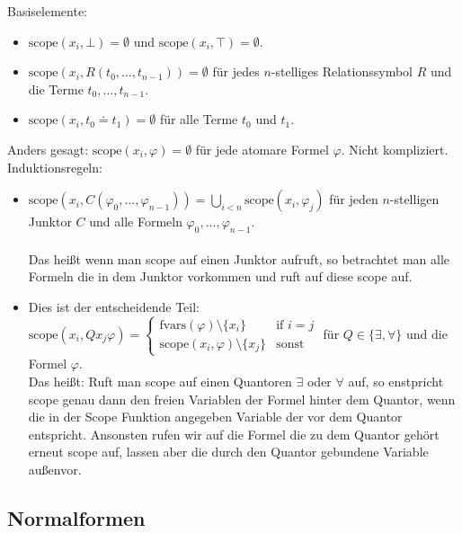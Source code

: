\documentclass[twocolumn]{article}
\begin{document}
    Basiselemente:
    \begin{itemize}
        \item $\text{scope}(x_i, \bot) = \emptyset$ und $\text{scope}(x_i, \top) = \emptyset$.
        \item $\text{scope}(x_i, R(t_0, \dots, t_{n-1})) = \emptyset$ für jedes $n$-stelliges Relationssymbol $R$ und die Terme $t_0, \dots, t_{n-1}$.
        \item $\text{scope}(x_i, t_0 \doteq t_1) = \emptyset$ für alle Terme $t_0$ und $t_1$.
    \end{itemize}
    Anders gesagt: $\text{scope}(x_i, \varphi) = \emptyset$ für jede atomare Formel $\varphi$. Nicht kompliziert.\\

    Induktionsregeln:
    \begin{itemize}
        \item $\text{scope}(x_i, C(\varphi_0, \dots, \varphi_{n-1})) = \bigcup_{i<n} \text{scope}(x_i, \varphi_j)$ für jeden $n$-stelligen Junktor $C$ und alle Formeln $\varphi_0, \dots, \varphi_{n-1}$.\\\\
            Das heißt wenn man scope auf einen Junktor aufruft, so betrachtet man alle Formeln die in dem Junktor vorkommen und ruft auf diese scope auf.
        \item 
            Dies ist der entscheidende Teil:\\
            $\text{scope}(x_i, Q x_j \varphi) = \begin{cases}\text{fvars}(\varphi) \setminus \{x_i\} & \text{if $i = j$}\\ \text{scope}(x_i, \varphi) \setminus \{x_j\} & \text{sonst}\end{cases}$ für $Q \in \{\exists, \forall\}$ und die Formel $\varphi$.\\
            Das heißt: Ruft man scope auf einen Quantoren $\exists$ oder $\forall$ auf, so enstpricht scope genau dann den freien Variablen der Formel hinter dem Quantor, wenn die in der Scope Funktion angegeben Variable der vor dem Quantor entspricht. Ansonsten rufen wir auf die Formel die zu dem Quantor gehört erneut scope auf, lassen aber die durch den Quantor gebundene Variable außenvor.  
    \end{itemize}
    
    \subsection{Normalformen}
\end{document}

